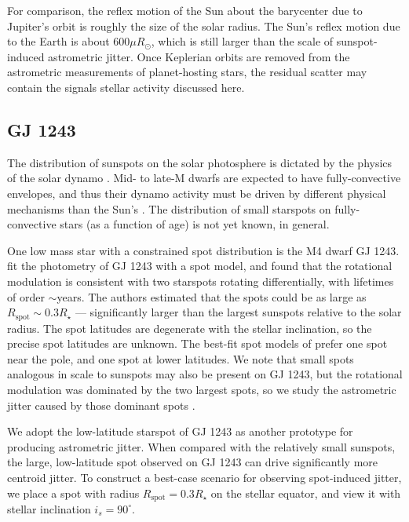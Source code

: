 For comparison, the reflex motion of the Sun about the barycenter due to Jupiter's orbit is roughly the size of the solar radius. The Sun's reflex motion due to the Earth is about $600 \mu R_\odot$, which is still larger than the scale of sunspot-induced astrometric jitter. Once Keplerian orbits are removed from the astrometric measurements of planet-hosting stars, the residual scatter may contain the signals stellar activity discussed here.

\subsection{GJ 1243}

The distribution of sunspots on the solar photosphere is dictated by the physics of the solar dynamo \citep[see reviews by][]{Charbonneau2014, Hathaway2015}. Mid- to late-M dwarfs are expected to have fully-convective envelopes, and thus their dynamo activity must be driven by different physical mechanisms than the Sun's \citep{Morin2010}. The distribution of small starspots on fully-convective stars (as a function of age) is not yet known, in general.

One low mass star with a constrained spot distribution is the M4 dwarf GJ 1243. \citet{Davenport2015} fit the \kepler photometry of GJ 1243 with a spot model, and found that the rotational modulation is consistent with two starspots rotating differentially, with lifetimes of order $\sim$years. The authors estimated that the spots could be as large as $R_{\mathrm{spot}} \sim 0.3 R_\star$ --- significantly larger than the largest sunspots relative to the solar radius. The spot latitudes are degenerate with the stellar inclination, so the precise spot latitudes are unknown. The best-fit spot models of \citet{Davenport2015} prefer one spot near the pole, and one spot at lower latitudes. We note that small spots analogous in scale to sunspots may also be present on GJ 1243, but the rotational modulation was dominated by the two largest spots, so we study the astrometric jitter caused by those  dominant spots \citep{Davenport2015}.

We adopt the low-latitude starspot of GJ 1243 as another prototype for producing astrometric jitter. When compared with the relatively small sunspots, the large, low-latitude spot observed on GJ 1243 can drive significantly more centroid jitter. To construct a best-case scenario for observing spot-induced jitter, we place a spot with radius $R_{\mathrm{spot}} = 0.3R_\star$ on the stellar equator, and view it with stellar inclination $i_s = 90^\circ$. 

